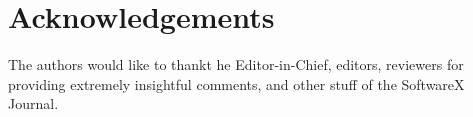\documentclass[preprint,review, 12pt, a4paper]{elsarticle}
\begin{document}
\section*{Acknowledgements}
\label{section:Acknowledgements}

The authors would like to thankt he Editor-in-Chief, editors, reviewers for providing extremely insightful comments, and other stuff  of the SoftwareX Journal.



 








\end{document}
